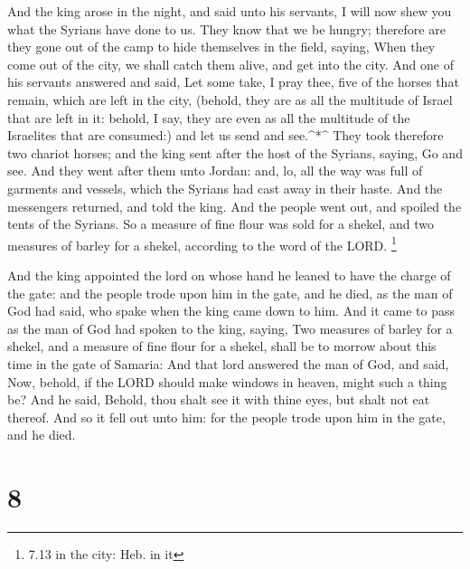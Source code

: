  And the king arose in the night, and said unto his
servants, I will now shew you what the Syrians have done to us. They
know that we be hungry; therefore are they gone out of the camp to hide
themselves in the field, saying, When they come out of the city, we
shall catch them alive, and get into the city.  And one of
his servants answered and said, Let some take, I pray thee, five of the
horses that remain, which are left in the city, (behold, they are as all
the multitude of Israel that are left in it: behold, I say, they are
even as all the multitude of the Israelites that are consumed:) and let
us send and see.\^{}*\^{}  They took therefore two chariot
horses; and the king sent after the host of the Syrians, saying, Go and
see.  And they went after them unto Jordan: and, lo, all
the way was full of garments and vessels, which the Syrians had cast
away in their haste. And the messengers returned, and told the king.
 And the people went out, and spoiled the tents of the
Syrians. So a measure of fine flour was sold for a shekel, and two
measures of barley for a shekel, according to the word of the LORD.
\footnote{7.13 in the city: Heb. in it}

 And the king appointed the lord on whose hand he leaned to
have the charge of the gate: and the people trode upon him in the gate,
and he died, as the man of God had said, who spake when the king came
down to him.  And it came to pass as the man of God had
spoken to the king, saying, Two measures of barley for a shekel, and a
measure of fine flour for a shekel, shall be to morrow about this time
in the gate of Samaria:  And that lord answered the man of
God, and said, Now, behold, if the LORD should make windows in heaven,
might such a thing be? And he said, Behold, thou shalt see it with thine
eyes, but shalt not eat thereof.  And so it fell out unto
him: for the people trode upon him in the gate, and he died.

\hypertarget{section-7}{%
\section{8}\label{section-7}}

